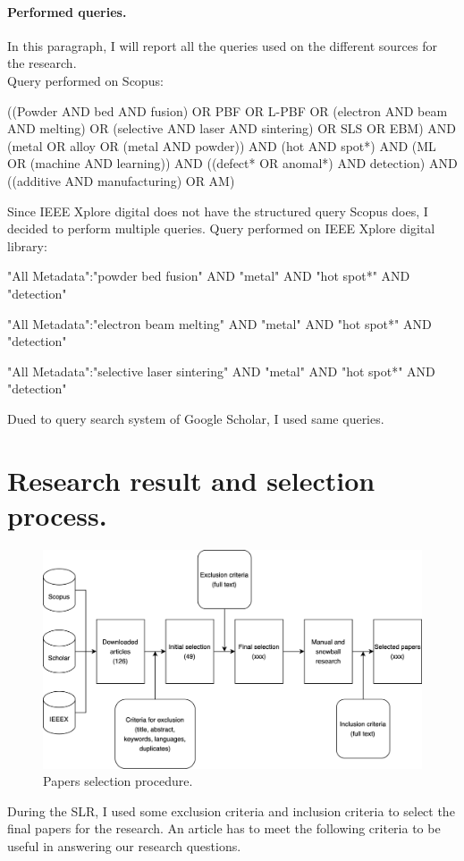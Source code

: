 \paragraph{Performed queries.} In this paragraph, I will report all the queries used on the different sources for the research. \\[1.5ex]
Query performed on Scopus:
\begin{tcolorbox}
\footnotesize
((Powder AND bed AND fusion) OR PBF OR L-PBF OR (electron AND beam AND melting) OR (selective AND laser AND sintering) OR SLS OR EBM) AND (metal OR alloy OR (metal AND powder)) AND  (hot AND spot*) AND (ML OR (machine AND learning)) AND ((defect* OR anomal*) AND detection) AND ((additive AND manufacturing) OR AM)
\end{tcolorbox}
Since IEEE Xplore digital does not have the structured query Scopus does, I decided to perform multiple queries. Query performed on IEEE Xplore digital library:
\begin{tcolorbox}
\footnotesize
"All Metadata":"powder bed fusion" AND "metal" AND "hot spot*" AND "detection"
\end{tcolorbox}
\begin{tcolorbox}
\footnotesize
"All Metadata":"electron beam melting" AND "metal" AND "hot spot*" AND "detection"
\end{tcolorbox}
\begin{tcolorbox}
\footnotesize
"All Metadata":"selective laser sintering" AND "metal" AND "hot spot*" AND "detection"
\end{tcolorbox}
Dued to query search system of Google Scholar, I used same queries.



\section{Research result and selection process.}
\label{sec:resresults}
\begin{figure}
    \centering
    \includegraphics[scale=0.2]{Images/selezioncina.png}
    \caption[Papers selection procedure.] {Papers selection procedure.}
    \label{fig:selezioncina}
\end{figure}
During the SLR, I used some exclusion criteria and inclusion criteria to select the final papers for the research. An article has to meet the following criteria to be useful in answering our research questions.
